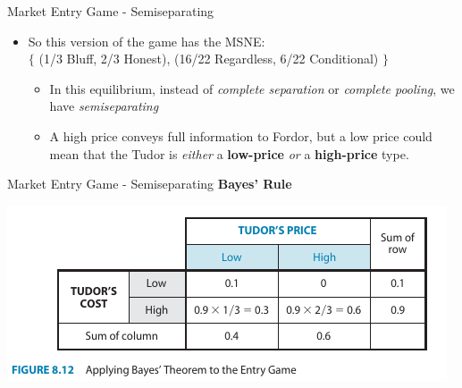 
\begin{frame}[plain]{}
  
\end{frame}


\begin{frame}{Market Entry Game - Semiseparating}
  \begin{itemize}
  \item So this version of the game has the MSNE:\\ 
  $\{$ (1/3 Bluff, 2/3 Honest), (16/22 Regardless, 6/22 Conditional) $\}$
  \begin{itemize}
    \item In this equilibrium, instead of \textit{complete separation}  
    or \textit{complete pooling}, 
    we have \alert{\textit{semiseparating}}
    \item A high price conveys full information to Fordor, 
    but a low price could mean that the Tudor is \textit{either} 
    a \textbf{low-price} \textit{or} a \textbf{high-price} type.
  \end{itemize}
  \end{itemize}
\end{frame}


\begin{frame}{Market Entry Game - Semiseparating}
  \textbf{Bayes' Rule} 
  \begin{center}
    \includegraphics[width=.9\textwidth]{figures/Fig812.png} 
  \end{center}
\end{frame}
